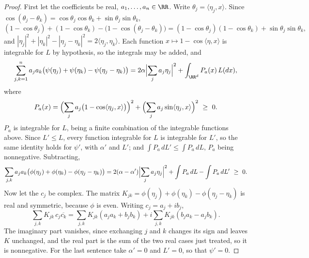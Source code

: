 \begin{proof}
\leanok
First let the coefficients be real, $a_1, \dots, a_n \in \RR$. Write $\theta_j = \langle\eta_j,x\rangle$.
Since $\cos(\theta_j - \theta_k) = \cos\theta_j\cos\theta_k + \sin\theta_j\sin\theta_k$,
\[
  (1 - \cos\theta_j) + (1 - \cos\theta_k) - \bigl(1 - \cos(\theta_j - \theta_k)\bigr)
  = (1 - \cos\theta_j)(1 - \cos\theta_k) + \sin\theta_j\sin\theta_k ,
\]
and $|\eta_j|^2 + |\eta_k|^2 - |\eta_j - \eta_k|^2 = 2\langle\eta_j,\eta_k\rangle$. Each function
$x \mapsto 1 - \cos\langle\eta,x\rangle$ is integrable for $L$ by hypothesis, so the integrals may be
added, and
\[
  \sum_{j,k=1}^n a_j a_k\bigl(\psi(\eta_j) + \psi(\eta_k) - \psi(\eta_j - \eta_k)\bigr)
  = 2\alpha\Bigl|\sum_j a_j\eta_j\Bigr|^2 + \int_{\RR^d} P_a(x)\,L(dx),
\]
where
\[
  P_a(x) = \Bigl(\sum_j a_j\bigl(1 - \cos\langle\eta_j,x\rangle\bigr)\Bigr)^2
  + \Bigl(\sum_j a_j\sin\langle\eta_j,x\rangle\Bigr)^2 \ \ge\ 0 .
\]
$P_a$ is integrable for $L$, being a finite combination of the integrable functions above. Since
$L' \le L$, every function integrable for $L$ is integrable for $L'$, so the same identity holds
for $\psi'$, with $\alpha'$ and $L'$; and $\int P_a\,dL' \le \int P_a\,dL$, $P_a$ being nonnegative.
Subtracting,
\[
  \sum_{j,k} a_j a_k\bigl(\phi(\eta_j) + \phi(\eta_k) - \phi(\eta_j - \eta_k)\bigr)
  = 2(\alpha - \alpha')\Bigl|\sum_j a_j\eta_j\Bigr|^2
  + \int P_a\,dL - \int P_a\,dL' \ \ge\ 0 .
\]
Now let the $c_j$ be complex. The matrix $K_{jk} = \phi(\eta_j) + \phi(\eta_k) - \phi(\eta_j -
\eta_k)$ is real and symmetric, because $\phi$ is even. Writing $c_j = a_j + ib_j$,
\[
  \sum_{j,k} K_{jk}\,c_j\overline{c_k}
  = \sum_{j,k} K_{jk}(a_ja_k + b_jb_k) + i\sum_{j,k} K_{jk}(b_ja_k - a_jb_k) .
\]
The imaginary part vanishes, since exchanging $j$ and $k$ changes its sign and leaves $K$ unchanged,
and the real part is the sum of the two real cases just treated, so it is nonnegative. For the last
sentence take $\alpha' = 0$ and $L' = 0$, so that $\psi' = 0$.
\end{proof}

